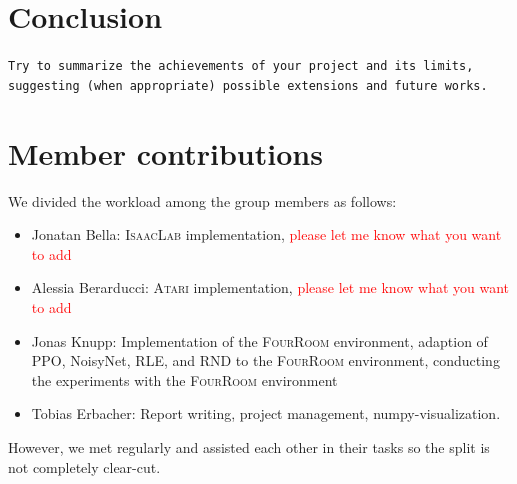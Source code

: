 \documentclass[10pt]{article} %
\begin{document}
\section{Conclusion}
\texttt{Try to summarize the achievements of your project and its limits, suggesting (when appropriate) possible extensions and future works.}

\section*{Member contributions}

\noindent We divided the workload among the group members as follows:

\begin{itemize}
  \item Jonatan Bella: \textsc{IsaacLab} implementation, \textcolor{red}{please let me know what you want to add}
  \item Alessia Berarducci: \textsc{Atari} implementation, \textcolor{red}{please let me know what you want to add}
  \item Jonas Knupp: Implementation of the \textsc{FourRoom} environment, adaption of PPO, NoisyNet, RLE, and RND to the \textsc{FourRoom} environment, conducting the experiments with the \textsc{FourRoom} environment
  \item Tobias Erbacher: Report writing, project management, numpy-visualization.
\end{itemize}

\noindent However, we met regularly and assisted each other in their tasks so the split is not completely clear-cut.






\end{document}
